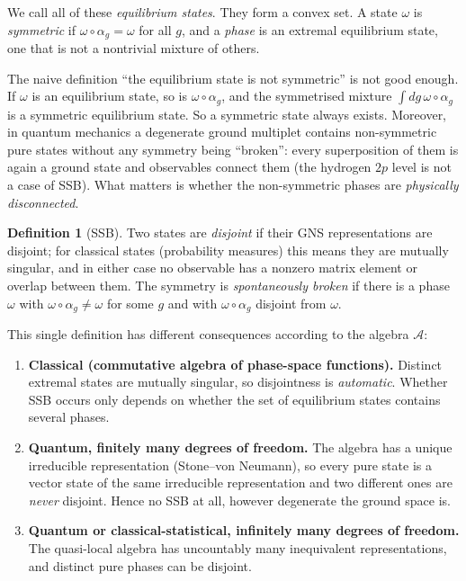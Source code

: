 \documentclass[11pt,a4paper]{article}
\theoremstyle{definition}
\newtheorem{definition}{Definition}
\theoremstyle{remark}
\begin{document}
We call all of these \emph{equilibrium states}. They form a convex set. A state $\omega$ is \emph{symmetric}
if $\omega\circ\alpha_g=\omega$ for all $g$, and a \emph{phase} is an extremal equilibrium state, one that is
not a nontrivial mixture of others.

The naive definition ``the equilibrium state is not symmetric'' is not good enough. If $\omega$ is an equilibrium
state, so is $\omega\circ\alpha_g$, and the symmetrised mixture $\int dg\,\omega\circ\alpha_g$ is a symmetric
equilibrium state. So a symmetric state always exists. Moreover, in quantum mechanics a degenerate ground
multiplet contains non-symmetric pure states without any symmetry being ``broken'': every superposition of them
is again a ground state and observables connect them (the hydrogen $2p$ level is not a case of SSB). What
matters is whether the non-symmetric phases are \emph{physically disconnected}.

\begin{definition}[SSB]\label{def:ssb}
Two states are \emph{disjoint} if their GNS representations are disjoint; for classical states
(probability measures) this means they are mutually singular, and in either case no observable has a nonzero
matrix element or overlap between them. The symmetry is \emph{spontaneously broken} if there is a phase
$\omega$ with $\omega\circ\alpha_g\neq\omega$ for some $g$ and with $\omega\circ\alpha_g$ disjoint from
$\omega$.
\end{definition}

This single definition has different consequences according to the algebra $\mathcal A$:

\begin{enumerate}
\item \textbf{Classical (commutative algebra of phase-space functions).} Distinct extremal states are
mutually singular, so disjointness is \emph{automatic}. Whether SSB occurs only depends on whether the set of
equilibrium states contains several phases.
\item \textbf{Quantum, finitely many degrees of freedom.} The algebra has a unique irreducible representation
(Stone--von Neumann), so every pure state is a vector state of the same irreducible representation and two
different ones are \emph{never} disjoint. Hence no SSB at all, however degenerate the ground space is.
\item \textbf{Quantum or classical-statistical, infinitely many degrees of freedom.} The quasi-local
algebra has uncountably many inequivalent representations, and distinct pure phases can be disjoint.
\end{enumerate}
\end{document}
